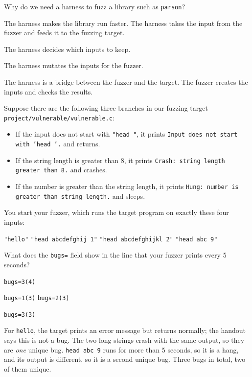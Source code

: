 \documentclass[addpoints]{exam}
\newcommand{\Code}[1]{\texttt{#1}}
\begin{document}
\begin{questions}

  \vspace{12pt}
\question[1] Why do we need a harness to fuzz a library such as
  \Code{parson}?
  \begin{choices}
  \item The harness makes the library run faster.
    \CorrectChoice The harness takes the input from the fuzzer and feeds
    it to the fuzzing target.
  \item The harness decides which inputs to keep.
  \item The harness mutates the inputs for the fuzzer.
  \end{choices}
  \begin{solution}
    The harness is a bridge between the fuzzer and the target. The
    fuzzer creates the inputs and checks the results.
  \end{solution}

  \vspace{12pt}
\question[1] Suppose there are the following three branches in our
  fuzzing target \Code{project/vulnerable/vulnerable.c}:
  \begin{itemize}
  \item If the input does not start with \Code{"head "}, it prints
    \texttt{Input does not start with 'head '.} and returns.
  \item If the string length is greater than 8, it prints
    \texttt{Crash: string length greater than 8.} and crashes.
  \item If the number is greater than the string length, it prints
    \texttt{Hung: number is greater than string length.} and sleeps.
  \end{itemize}

  You start your fuzzer, which runs the target program on exactly
  these four inputs:

  \begin{center}
    \Code{"hello"} \quad\quad \Code{"head abcdefghij 1"} \quad\quad
    \Code{"head abcdefghijkl 2"} \quad\quad \Code{"head abc 9"}
  \end{center}

  What does the \Code{bugs=} field show in the line that your fuzzer
  prints every 5 seconds?
  \begin{choices}
  \item \Code{bugs=3(4)}
  \item \Code{bugs=1(3)}
  \CorrectChoice \Code{bugs=2(3)}
  \item \Code{bugs=3(3)}
  \end{choices}
  \begin{solution}
    For \Code{hello}, the target prints an error message but returns
    normally; the handout says this is not a bug. The two long strings
    crash with the same output, so they are \emph{one} unique bug.
    \Code{head abc 9} runs for more than 5 seconds, so it is a hang,
    and its output is different, so it is a second unique bug. Three
    bugs in total, two of them unique.
  \end{solution}


\end{questions}
\end{document}
